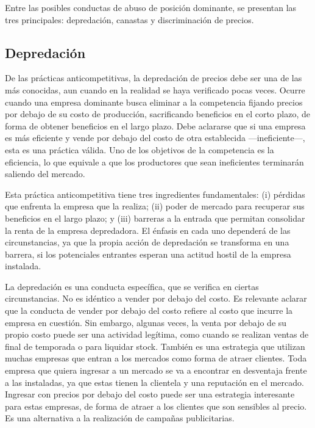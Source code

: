 \documentclass[
  12pt,
  spanish,
]{book}
\begin{document}
Entre las posibles conductas de abuso de posición dominante, se
presentan las tres principales: depredación, canastas y discriminación
de precios.

\hypertarget{depredaciuxf3n}{%
\subsection{Depredación}\label{depredaciuxf3n}}

De las prácticas anticompetitivas, la depredación de precios debe ser
una de las más conocidas, aun cuando en la realidad se haya verificado
pocas veces. Ocurre cuando una empresa dominante busca eliminar a la
competencia fijando precios por debajo de su costo de producción,
sacrificando beneficios en el corto plazo, de forma de obtener
beneficios en el largo plazo. Debe aclararse que si una empresa es más
eficiente y vende por debajo del costo de otra establecida
---ineficiente---, esta es una práctica válida. Uno de los objetivos de
la competencia es la eficiencia, lo que equivale a que los productores
que sean ineficientes terminarán saliendo del mercado.

Esta práctica anticompetitiva tiene tres ingredientes fundamentales: (i)
pérdidas que enfrenta la empresa que la realiza; (ii) poder de mercado
para recuperar sus beneficios en el largo plazo; y (iii) barreras a la
entrada que permitan consolidar la renta de la empresa depredadora. El
énfasis en cada uno dependerá de las circunstancias, ya que la propia
acción de depredación se transforma en una barrera, si los potenciales
entrantes esperan una actitud hostil de la empresa instalada.

La depredación es una conducta específica, que se verifica en ciertas
circunstancias. No es idéntico a vender por debajo del costo. Es
relevante aclarar que la conducta de vender por debajo del costo refiere
al costo que incurre la empresa en cuestión. Sin embargo, algunas veces,
la venta por debajo de su propio costo puede ser una actividad legítima,
como cuando se realizan ventas de final de temporada o para liquidar
stock. También es una estrategia que utilizan muchas empresas que entran
a los mercados como forma de atraer clientes. Toda empresa que quiera
ingresar a un mercado se va a encontrar en desventaja frente a las
instaladas, ya que estas tienen la clientela y una reputación en el
mercado. Ingresar con precios por debajo del costo puede ser una
estrategia interesante para estas empresas, de forma de atraer a los
clientes que son sensibles al precio. Es una alternativa a la
realización de campañas publicitarias.
\end{document}
